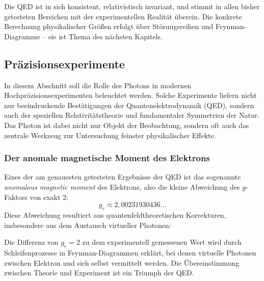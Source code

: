 Die QED ist in sich konsistent, relativistisch invariant, und stimmt in allen bisher getesteten Bereichen mit der experimentellen Realität überein. Die konkrete Berechnung physikalischer Größen erfolgt über Störungsreihen und Feynman-Diagramme – sie ist Thema des nächsten Kapitels.

\subsection{Präzisionsexperimente}

In diesem Abschnitt soll die Rolle des Photons in modernen Hochpräzisionsexperimenten beleuchtet werden. Solche Experimente liefern nicht nur beeindruckende Bestätigungen der Quantenelektrodynamik (QED), sondern auch der speziellen Relativitätstheorie und fundamentaler Symmetrien der Natur. Das Photon ist dabei nicht nur Objekt der Beobachtung, sondern oft auch das zentrale Werkzeug zur Untersuchung feinster physikalischer Effekte.

\subsubsection{Der anomale magnetische Moment des Elektrons}

Eines der am genauesten getesteten Ergebnisse der QED ist das sogenannte \emph{anomalous magnetic moment} des Elektrons, also die kleine Abweichung des $g$-Faktors von exakt 2:
\[
g_e \approx 2{,}00231930436...
\]
Diese Abweichung resultiert aus quantenfeldtheoretischen Korrekturen, insbesondere aus dem Austausch virtueller Photonen:
\vspace{1em}
\begin{tcolorbox}[physikbox,title=Physikalische Bedeutung]
	\label{box:physikalische Bedeutung}
	Die Differenz von $g_e = 2$ zu dem experimentell gemessenen Wert wird durch Schleifenprozesse in Feynman-Diagrammen erklärt, bei denen virtuelle Photonen zwischen Elektron und sich selbst vermittelt werden. Die Übereinstimmung zwischen Theorie und Experiment ist ein Triumph der QED.
\end{tcolorbox}

